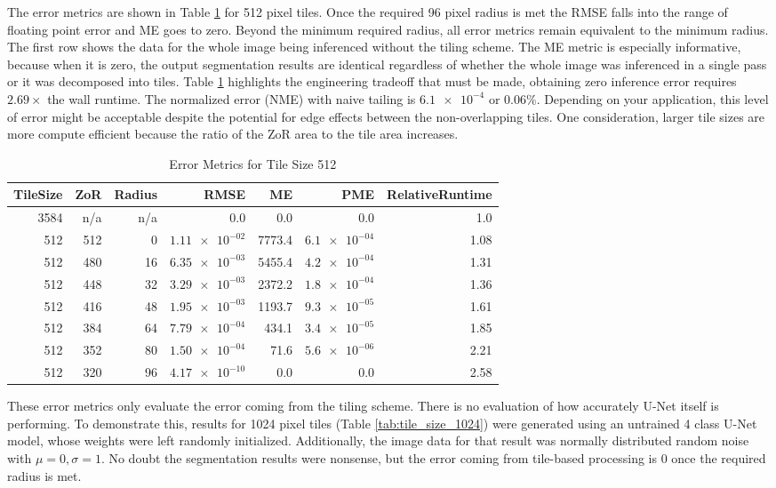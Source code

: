\documentclass[runningheads]{llncs}
\begin{document}
The error metrics are shown in Table \ref{tab:tile_size_512} for 512 pixel tiles. Once the required 96 pixel radius is met the RMSE falls into the range of floating point error and ME goes to zero. Beyond the minimum required radius, all error metrics remain equivalent to the minimum radius. The first row shows the data for the whole image being inferenced without the tiling scheme. 
The ME metric is especially informative, because when it is zero, the output segmentation results are identical regardless of whether the whole image was inferenced in a single pass or it was decomposed into tiles. Table \ref{tab:tile_size_512} highlights the engineering tradeoff that must be made, obtaining zero inference error requires $2.69 \times$ the wall runtime. The normalized error (NME) with naive tailing is $\num{6.1e-4}$ or $\num{0.06} \%$. Depending on your application, this level of error might be acceptable despite the potential for edge effects between the non-overlapping tiles. One consideration, larger tile sizes are more compute efficient because the ratio of the ZoR area to the tile area increases.

\begin{table}[h!]
	\centering
\caption{Error Metrics for Tile Size 512}
\label{tab:tile_size_512}
\begin{tabular}{r|r|r|r|r|r|r}
	TileSize & ZoR & Radius & RMSE    & ME & PME & RelativeRuntime \\ 
	\hline
3584 & n/a & n/a & 0.0 & 0.0 & 0.0 & 1.0 \\
512 & 512 & 0 & $\num{1.11e-02}$ & 7773.4 & $\num{6.1e-04}$ & 1.08 \\
512 & 480 & 16 & $\num{6.35e-03}$ & 5455.4 & $\num{4.2e-04}$ & 1.31 \\
512 & 448 & 32 & $\num{3.29e-03}$ & 2372.2 & $\num{1.8e-04}$ & 1.36 \\
512 & 416 & 48 & $\num{1.95e-03}$ & 1193.7 & $\num{9.3e-05}$ & 1.61 \\
512 & 384 & 64 & $\num{7.79e-04}$ & 434.1 & $\num{3.4e-05}$ & 1.85 \\
512 & 352 & 80 & $\num{1.50e-04}$ & 71.6 & $\num{5.6e-06}$ & 2.21 \\
512 & 320 & 96 & $\num{4.17e-10}$ & 0.0 & 0.0 & 2.58 \\
\end{tabular}
\end{table}

These error metrics only evaluate the error coming from the tiling scheme. There is no evaluation of how accurately U-Net itself is performing. 
To demonstrate this, results for 1024 pixel tiles (Table \ref{tab:tile_size_1024}) were generated using an untrained 4 class U-Net model, whose weights were left randomly initialized. Additionally, the image data for that result was normally distributed random noise with $\mu = 0, \sigma = 1$. No doubt the segmentation results were nonsense, but the error coming from tile-based processing is 0 once the required radius is met.
\end{document}
